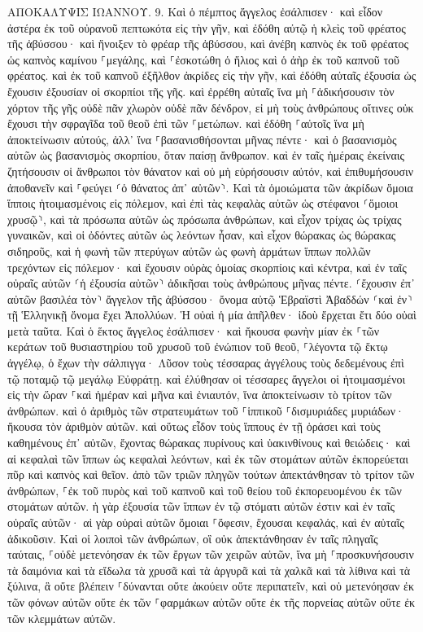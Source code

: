 \documentclass[twoside, 9pt]{extreport}
\begin{document}
ΑΠΟΚΑΛΥΨΙΣ ΙΩΑΝΝΟΥ.
9.
Καὶ ὁ πέμπτος ἄγγελος ἐσάλπισεν· καὶ εἶδον ἀστέρα ἐκ τοῦ οὐρανοῦ πεπτωκότα εἰς τὴν γῆν, καὶ ἐδόθη αὐτῷ ἡ κλεὶς τοῦ φρέατος τῆς ἀβύσσου· 
καὶ ἤνοιξεν τὸ φρέαρ τῆς ἀβύσσου, καὶ ἀνέβη καπνὸς ἐκ τοῦ φρέατος ὡς καπνὸς καμίνου ⸀μεγάλης, καὶ ⸀ἐσκοτώθη ὁ ἥλιος καὶ ὁ ἀὴρ ἐκ τοῦ καπνοῦ τοῦ φρέατος. 
καὶ ἐκ τοῦ καπνοῦ ἐξῆλθον ἀκρίδες εἰς τὴν γῆν, καὶ ἐδόθη αὐταῖς ἐξουσία ὡς ἔχουσιν ἐξουσίαν οἱ σκορπίοι τῆς γῆς. 
καὶ ἐρρέθη αὐταῖς ἵνα μὴ ⸀ἀδικήσουσιν τὸν χόρτον τῆς γῆς οὐδὲ πᾶν χλωρὸν οὐδὲ πᾶν δένδρον, εἰ μὴ τοὺς ἀνθρώπους οἵτινες οὐκ ἔχουσι τὴν σφραγῖδα τοῦ θεοῦ ἐπὶ τῶν ⸀μετώπων. 
καὶ ἐδόθη ⸀αὐτοῖς ἵνα μὴ ἀποκτείνωσιν αὐτούς, ἀλλ᾽ ἵνα ⸀βασανισθήσονται μῆνας πέντε· καὶ ὁ βασανισμὸς αὐτῶν ὡς βασανισμὸς σκορπίου, ὅταν παίσῃ ἄνθρωπον. 
καὶ ἐν ταῖς ἡμέραις ἐκείναις ζητήσουσιν οἱ ἄνθρωποι τὸν θάνατον καὶ οὐ μὴ εὑρήσουσιν αὐτόν, καὶ ἐπιθυμήσουσιν ἀποθανεῖν καὶ ⸀φεύγει ⸂ὁ θάνατος ἀπ᾽ αὐτῶν⸃. 
Καὶ τὰ ὁμοιώματα τῶν ἀκρίδων ὅμοια ἵπποις ἡτοιμασμένοις εἰς πόλεμον, καὶ ἐπὶ τὰς κεφαλὰς αὐτῶν ὡς στέφανοι ⸂ὅμοιοι χρυσῷ⸃, καὶ τὰ πρόσωπα αὐτῶν ὡς πρόσωπα ἀνθρώπων, 
καὶ εἶχον τρίχας ὡς τρίχας γυναικῶν, καὶ οἱ ὀδόντες αὐτῶν ὡς λεόντων ἦσαν, 
καὶ εἶχον θώρακας ὡς θώρακας σιδηροῦς, καὶ ἡ φωνὴ τῶν πτερύγων αὐτῶν ὡς φωνὴ ἁρμάτων ἵππων πολλῶν τρεχόντων εἰς πόλεμον· 
καὶ ἔχουσιν οὐρὰς ὁμοίας σκορπίοις καὶ κέντρα, καὶ ἐν ταῖς οὐραῖς αὐτῶν ⸂ἡ ἐξουσία αὐτῶν⸃ ἀδικῆσαι τοὺς ἀνθρώπους μῆνας πέντε. 
⸂ἔχουσιν ἐπ᾽ αὐτῶν βασιλέα τὸν⸃ ἄγγελον τῆς ἀβύσσου· ὄνομα αὐτῷ Ἑβραϊστὶ Ἀβαδδών ⸂καὶ ἐν⸃ τῇ Ἑλληνικῇ ὄνομα ἔχει Ἀπολλύων. 
Ἡ οὐαὶ ἡ μία ἀπῆλθεν· ἰδοὺ ἔρχεται ἔτι δύο οὐαὶ μετὰ ταῦτα. 
Καὶ ὁ ἕκτος ἄγγελος ἐσάλπισεν· καὶ ἤκουσα φωνὴν μίαν ἐκ ⸀τῶν κεράτων τοῦ θυσιαστηρίου τοῦ χρυσοῦ τοῦ ἐνώπιον τοῦ θεοῦ, 
⸀λέγοντα τῷ ἕκτῳ ἀγγέλῳ, ὁ ἔχων τὴν σάλπιγγα· Λῦσον τοὺς τέσσαρας ἀγγέλους τοὺς δεδεμένους ἐπὶ τῷ ποταμῷ τῷ μεγάλῳ Εὐφράτῃ. 
καὶ ἐλύθησαν οἱ τέσσαρες ἄγγελοι οἱ ἡτοιμασμένοι εἰς τὴν ὥραν ⸀καὶ ἡμέραν καὶ μῆνα καὶ ἐνιαυτόν, ἵνα ἀποκτείνωσιν τὸ τρίτον τῶν ἀνθρώπων. 
καὶ ὁ ἀριθμὸς τῶν στρατευμάτων τοῦ ⸀ἱππικοῦ ⸀δισμυριάδες μυριάδων· ἤκουσα τὸν ἀριθμὸν αὐτῶν. 
καὶ οὕτως εἶδον τοὺς ἵππους ἐν τῇ ὁράσει καὶ τοὺς καθημένους ἐπ᾽ αὐτῶν, ἔχοντας θώρακας πυρίνους καὶ ὑακινθίνους καὶ θειώδεις· καὶ αἱ κεφαλαὶ τῶν ἵππων ὡς κεφαλαὶ λεόντων, καὶ ἐκ τῶν στομάτων αὐτῶν ἐκπορεύεται πῦρ καὶ καπνὸς καὶ θεῖον. 
ἀπὸ τῶν τριῶν πληγῶν τούτων ἀπεκτάνθησαν τὸ τρίτον τῶν ἀνθρώπων, ⸀ἐκ τοῦ πυρὸς καὶ τοῦ καπνοῦ καὶ τοῦ θείου τοῦ ἐκπορευομένου ἐκ τῶν στομάτων αὐτῶν. 
ἡ γὰρ ἐξουσία τῶν ἵππων ἐν τῷ στόματι αὐτῶν ἐστιν καὶ ἐν ταῖς οὐραῖς αὐτῶν· αἱ γὰρ οὐραὶ αὐτῶν ὅμοιαι ⸀ὄφεσιν, ἔχουσαι κεφαλάς, καὶ ἐν αὐταῖς ἀδικοῦσιν. 
Καὶ οἱ λοιποὶ τῶν ἀνθρώπων, οἳ οὐκ ἀπεκτάνθησαν ἐν ταῖς πληγαῖς ταύταις, ⸀οὐδὲ μετενόησαν ἐκ τῶν ἔργων τῶν χειρῶν αὐτῶν, ἵνα μὴ ⸀προσκυνήσουσιν τὰ δαιμόνια καὶ τὰ εἴδωλα τὰ χρυσᾶ καὶ τὰ ἀργυρᾶ καὶ τὰ χαλκᾶ καὶ τὰ λίθινα καὶ τὰ ξύλινα, ἃ οὔτε βλέπειν ⸀δύνανται οὔτε ἀκούειν οὔτε περιπατεῖν, 
καὶ οὐ μετενόησαν ἐκ τῶν φόνων αὐτῶν οὔτε ἐκ τῶν ⸀φαρμάκων αὐτῶν οὔτε ἐκ τῆς πορνείας αὐτῶν οὔτε ἐκ τῶν κλεμμάτων αὐτῶν. 
\end{document}
